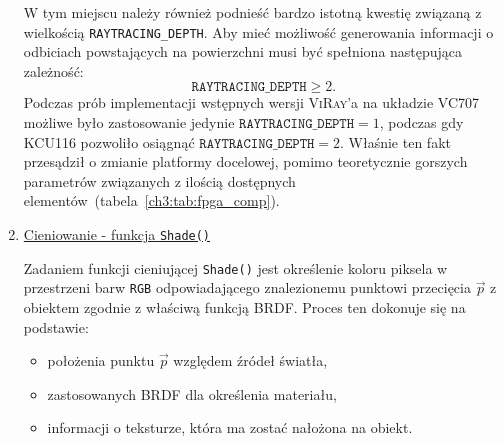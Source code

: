 \begin{enumerate}
W tym miejscu należy również podnieść bardzo istotną kwestię związaną z wielkością \texttt{RAYTRACING\_DEPTH}. Aby mieć możliwość generowania informacji o odbiciach powstających na powierzchni musi być spełniona następująca zależność:
\begin{equation*}
\mathtt{RAYTRACING\_DEPTH} \geq 2.
\end{equation*}
Podczas prób implementacji wstępnych wersji \textsc{ViRay}'a na układzie VC707 możliwe było zastosowanie jedynie $\mathtt{RAYTRACING\_DEPTH} = 1$, podczas gdy KCU116 pozwoliło osiągnąć $\mathtt{RAYTRACING\_DEPTH} = 2$. Właśnie ten fakt przesądził o zmianie platformy docelowej, pomimo teoretycznie gorszych parametrów związanych z ilością dostępnych elementów~(tabela~\ref{ch3:tab:fpga_comp}).



\item \underline{Cieniowanie - funkcja \texttt{Shade()}}

Zadaniem funkcji cieniującej \texttt{Shade()} jest określenie koloru piksela w przestrzeni barw \texttt{RGB} odpowiadającego znalezionemu punktowi przecięcia $\vec{p}$ z obiektem zgodnie z właściwą funkcją BRDF. Proces ten dokonuje się na podstawie:
\begin{itemize}
\item położenia punktu $\vec{p}$ względem źródeł światła,
\item zastosowanych BRDF dla określenia materiału,
\item informacji o teksturze, która ma zostać nałożona na obiekt.
\end{itemize} 


\end{enumerate}
